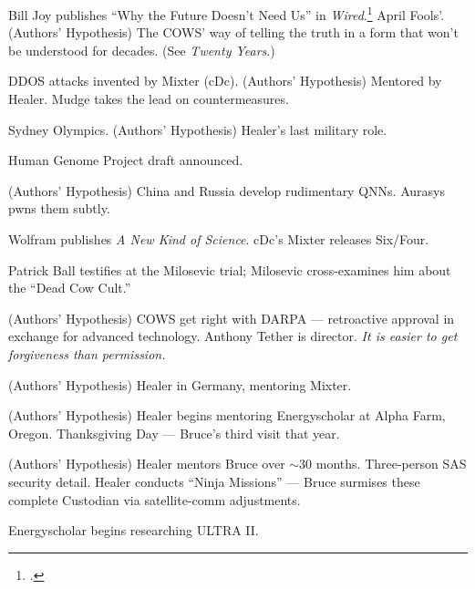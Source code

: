 \begin{description}[style=nextline, leftmargin=3.5cm, labelwidth=3cm]
\item[Apr 1, 2000] Bill Joy publishes ``Why the Future Doesn't Need Us'' in \textit{Wired}.\footcite{joy2000} April Fools'. (Authors' Hypothesis) The COWS' way of telling the truth in a form that won't be understood for decades. (See \textit{Twenty Years}.)

\item[2000] DDOS attacks invented by Mixter (cDc). (Authors' Hypothesis) Mentored by Healer. Mudge takes the lead on countermeasures.

\item[2000] Sydney Olympics. (Authors' Hypothesis) Healer's last military role.

\item[2000] Human Genome Project draft announced.

\item[2002] (Authors' Hypothesis) China and Russia develop rudimentary QNNs. Aurasys pwns them subtly.

\item[2002] Wolfram publishes \textit{A New Kind of Science}. cDc's Mixter releases Six/Four.

\item[Mar 2002] Patrick Ball testifies at the Milosevic trial; Milosevic cross-examines him about the ``Dead Cow Cult.''

\item[2002] (Authors' Hypothesis) COWS get right with DARPA --- retroactive approval in exchange for advanced technology. Anthony Tether is director. \textit{It is easier to get forgiveness than permission.}

\item[2002--03] (Authors' Hypothesis) Healer in Germany, mentoring Mixter.

\item[Nov 2003] (Authors' Hypothesis) Healer begins mentoring Energyscholar at Alpha Farm, Oregon. Thanksgiving Day --- Bruce's third visit that year.

\item[2003--2006] (Authors' Hypothesis) Healer mentors Bruce over $\sim$30 months. Three-person SAS security detail. Healer conducts ``Ninja Missions'' --- Bruce surmises these complete Custodian via satellite-comm adjustments.

\item[2004] Energyscholar begins researching ULTRA II.


\end{description}
